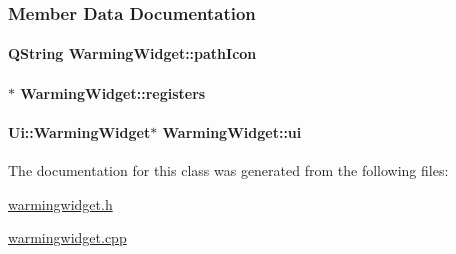 \subsubsection{Member Data Documentation}
\paragraph[{\texorpdfstring{path\+Icon}{pathIcon}}]{\setlength{\rightskip}{0pt plus 5cm}Q\+String Warming\+Widget\+::path\+Icon\hspace{0.3cm}{\ttfamily [private]}}\hypertarget{classWarmingWidget_a31c1abfa505e08fb4c5f9f34e82c7d15}{}\label{classWarmingWidget_a31c1abfa505e08fb4c5f9f34e82c7d15}
\paragraph[{\texorpdfstring{registers}{registers}}]{$\ast$ Warming\+Widget\+::registers\hspace{0.3cm}{\ttfamily [private]}}\hypertarget{classWarmingWidget_a83bc5e6ef3f7679874a3074a750266a9}{}\label{classWarmingWidget_a83bc5e6ef3f7679874a3074a750266a9}
\paragraph[{\texorpdfstring{ui}{ui}}]{\setlength{\rightskip}{0pt plus 5cm}Ui\+::\+Warming\+Widget$\ast$ Warming\+Widget\+::ui\hspace{0.3cm}{\ttfamily [private]}}\hypertarget{classWarmingWidget_ae2dad8434667ce8a34454989548084b2}{}\label{classWarmingWidget_ae2dad8434667ce8a34454989548084b2}


The documentation for this class was generated from the following files\+:\begin{DoxyCompactItemize}
\item 
\hyperlink{warmingwidget_8h}{warmingwidget.\+h}\item 
\hyperlink{warmingwidget_8cpp}{warmingwidget.\+cpp}\end{DoxyCompactItemize}
